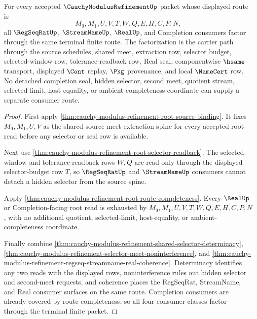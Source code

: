 \begin{theorem}
\label{thm:cauchy-modulus-refinement-regseq-streamname-real-terminal-factorization}
For every accepted $\CauchyModulusRefinementUp$ packet whose displayed route is
$$
M_0,M_1,U,V,T,W,Q,E,H,C,P,N,
$$
all $\RegSeqRatUp$, $\StreamNameUp$, $\RealUp$, and Completion consumers factor through the same terminal finite route. The factorization is the carrier path through the source schedules, shared meet, extraction row, selector budget, selected-window row, tolerance-readback row, Real seal, componentwise $\hsame$ transport, displayed $\Cont$ replay, $\Pkg$ provenance, and local $\NameCert$ row. No detached completion seal, hidden selector, second meet, quotient stream, selected limit, host equality, or ambient completeness coordinate can supply a separate consumer route.
\end{theorem}
\begin{proof}
First apply \autoref{thm:cauchy-modulus-refinement-root-source-binding}. It fixes $M_0,M_1,U,V$ as the shared source-meet-extraction spine for every accepted root read before any selector or seal row is available.

Next use \autoref{thm:cauchy-modulus-refinement-root-selector-readback}. The selected-window and tolerance-readback rows $W,Q$ are read only through the displayed selector-budget row $T$, so $\RegSeqRatUp$ and $\StreamNameUp$ consumers cannot detach a hidden selector from the source spine.

Apply \autoref{thm:cauchy-modulus-refinement-root-route-completeness}. Every $\RealUp$ or Completion-facing root read is exhausted by $M_0,M_1,U,V,T,W,Q,E,H,C,P,N$, with no additional quotient, selected-limit, host-equality, or ambient-completeness coordinate.

Finally combine \autoref{thm:cauchy-modulus-refinement-shared-selector-determinacy}, \autoref{thm:cauchy-modulus-refinement-selector-meet-noninterference}, and \autoref{thm:cauchy-modulus-refinement-regseq-streamname-real-coherence}. Determinacy identifies any two reads with the displayed rows, noninterference rules out hidden selector and second-meet requests, and coherence places the RegSeqRat, StreamName, and Real consumer surfaces on the same route. Completion consumers are already covered by route completeness, so all four consumer classes factor through the terminal finite packet.
\end{proof}

